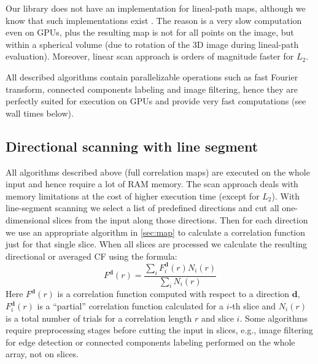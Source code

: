 \documentclass[reprint,amsmath,amssymb,aps,pre,showkeys,showpacs,nofootinbib]{revtex4-1}
\begin{document}
Our library does not have an implementation for lineal-path maps, although we
know that such implementations exist \cite{Paper}. The reason is a very slow
computation even on GPUs, plus the resulting map is not for all points on the image,
but within a spherical volume (due to rotation of the 3D image during lineal-path
evaluation). Moreover, linear scan approach is orders of magnitude faster for $L_2$.

All described algorithms contain parallelizable operations such as fast Fourier
transform, connected components labeling and image filtering, hence they are
perfectly suited for execution on GPUs and provide very fast computations (see wall times below).

\subsection{Directional scanning with line segment}
\label{sec:scan}
All algorithms described above (full correlation maps) are executed on the whole input and hence require
a lot of RAM memory. The scan approach deals with memory limitations at the cost of
higher execution time (except for $L_2$). With line-segment scanning we select a list of predefined
directions and cut all one-dimensional slices from the input along those
directions. Then for each direction we use an appropriate algorithm in
\cref{sec:map} to calculate a correlation function just for that single slice. When all
slices are processed we calculate the resulting directional or averaged CF using the formula:
\begin{equation*}
  F^{\bm{d}}(r) = \frac{\sum\limits_i F^{\bm{d}}_i(r) N_i(r)}{\sum\limits_i N_i(r)}
\end{equation*}
Here $F^{\bm{d}}(r)$ is a correlation function computed with respect to a
direction $\bm{d}$, $F^{\bm{d}}_i(r)$ is a ``partial'' correlation
function calculated for a $i$-th slice and $N_i(r)$ is a total number of trials
for a correlation length $r$ and slice $i$. Some algorithms require
preprocessing stages before cutting the input in slices, e.g., image filtering
for edge detection or connected components labeling performed on the whole
array, not on slices.
\end{document}
